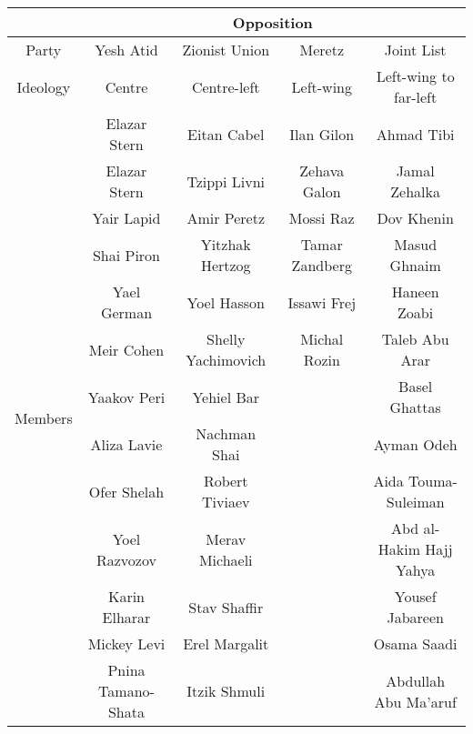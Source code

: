 \begin{landscape}
\begin{table}
\tiny
\begin{tabular}{|c|c|c|c|c|}
  \hline
                            & \multicolumn{4}{c|}{Opposition}                                                         \\
  \hline
Party                       & Yesh Atid          & Zionist Union         & Meretz         & Joint List                \\
  \hline
Ideology                    & Centre             & Centre-left           & Left-wing      & Left-wing to far-left     \\
  \hline
\multirow{29}{*}{Members}   & Elazar Stern       & Eitan Cabel           & Ilan Gilon     & Ahmad Tibi                \\
                            & Elazar Stern       & Tzippi Livni          & Zehava Galon   & Jamal Zehalka             \\
                            & Yair Lapid         & Amir Peretz           & Mossi Raz      & Dov Khenin                \\
                            & Shai Piron         & Yitzhak Hertzog       & Tamar Zandberg & Masud Ghnaim              \\
                            & Yael German        & Yoel Hasson           & Issawi Frej    & Haneen Zoabi              \\
                            & Meir Cohen         & Shelly Yachimovich    & Michal Rozin   & Taleb Abu Arar            \\
                            & Yaakov Peri        & Yehiel Bar            &                & Basel Ghattas             \\
                            & Aliza Lavie        & Nachman Shai          &                & Ayman Odeh                \\
                            & Ofer Shelah        & Robert Tiviaev        &                & Aida Touma-Suleiman       \\
                            & Yoel Razvozov      & Merav Michaeli        &                & Abd al-Hakim Hajj Yahya   \\
                            & Karin Elharar      & Stav Shaffir          &                & Yousef Jabareen           \\
                            & Mickey Levi        & Erel Margalit         &                & Osama Saadi               \\
                            & Pnina Tamano-Shata & Itzik Shmuli          &                & Abdullah Abu Ma'aruf      \\

\end{tabular}
\end{table}
\end{landscape}

